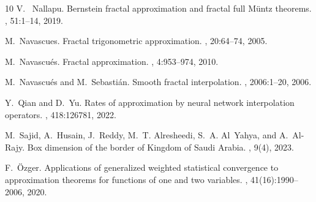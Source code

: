 \documentclass{article}[12pt, a4]
\begin{document}
\begin{thebibliography}{10}
			V.~ Nallapu.
			\newblock Bernstein fractal approximation and fractal full Müntz theorems.
			, 51:1--14, 2019.
			
			M.~Navascues.
			\newblock Fractal trigonometric approximation.
			, 20:64--74, 2005.
			
			M.~Navascu{\'e}s.
			\newblock Fractal approximation.
			, 4:953--974, 2010.
			
			
			M.~Navascu{\'e}s and M.~Sebasti{\'a}n.
			\newblock Smooth fractal interpolation.
			, 2006:1--20, 2006.
			
			Y.~Qian and D.~Yu.
			\newblock Rates of approximation by neural network interpolation operators.
			, 418:126781, 2022.
			
			M.~Sajid, A.~Husain, J.~Reddy, M.~T. Alresheedi, S.~A. Al~Yahya, and
			A.~Al-Rajy.
			\newblock Box dimension of the border of {K}ingdom of {S}audi {A}rabia.
			, 9(4), 2023.
			
			F.~Özger.
			\newblock Applications of generalized weighted statistical convergence to
			approximation theorems for functions of one and two variables.
			,
			41(16):1990--2006, 2020.
			
		\end{thebibliography}
		
	
\end{document}
